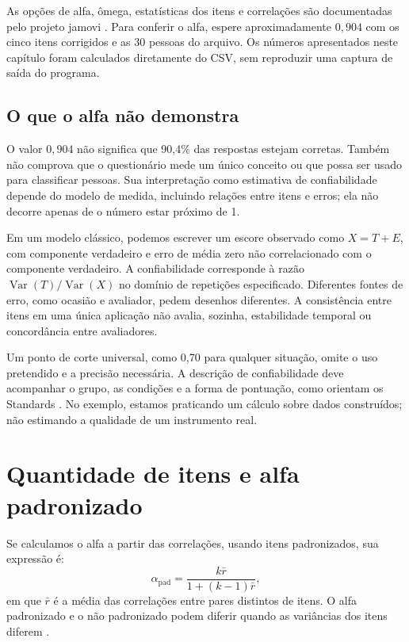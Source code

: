 As opções de alfa, ômega, estatísticas dos itens e correlações são documentadas pelo projeto jamovi \parencite{JamoviConfiabilidade}. Para conferir o alfa, espere aproximadamente $0{,}904$ com os cinco itens corrigidos e as 30 pessoas do arquivo. Os números apresentados neste capítulo foram calculados diretamente do CSV, sem reproduzir uma captura de saída do programa.

\subsection{O que o alfa não demonstra}

O valor $0{,}904$ não significa que 90,4\% das respostas estejam corretas. Também não comprova que o questionário mede um único conceito ou que possa ser usado para classificar pessoas. Sua interpretação como estimativa de confiabilidade depende do modelo de medida, incluindo relações entre itens e erros; ela não decorre apenas de o número estar próximo de 1.

Em um modelo clássico, podemos escrever um escore observado como $X=T+E$, com componente verdadeiro e erro de média zero não correlacionado com o componente verdadeiro. A confiabilidade corresponde à razão $\operatorname{Var}(T)/\operatorname{Var}(X)$ no domínio de repetições especificado. Diferentes fontes de erro, como ocasião e avaliador, pedem desenhos diferentes. A consistência entre itens em uma única aplicação não avalia, sozinha, estabilidade temporal ou concordância entre avaliadores.

Um ponto de corte universal, como 0,70 para qualquer situação, omite o uso pretendido e a precisão necessária. A descrição de confiabilidade deve acompanhar o grupo, as condições e a forma de pontuação, como orientam os Standards \parencite{Standards2014}. No exemplo, estamos praticando um cálculo sobre dados construídos; não estimando a qualidade de um instrumento real.

\section{Quantidade de itens e alfa padronizado}

Se calculamos o alfa a partir das correlações, usando itens padronizados, sua expressão é:
\[
\alpha_{\mathrm{pad}}=\frac{k\bar r}{1+(k-1)\bar r},
\]
em que $\bar r$ é a média das correlações entre pares distintos de itens. O alfa padronizado e o não padronizado podem diferir quando as variâncias dos itens diferem \parencite{RevelleAlpha}.

